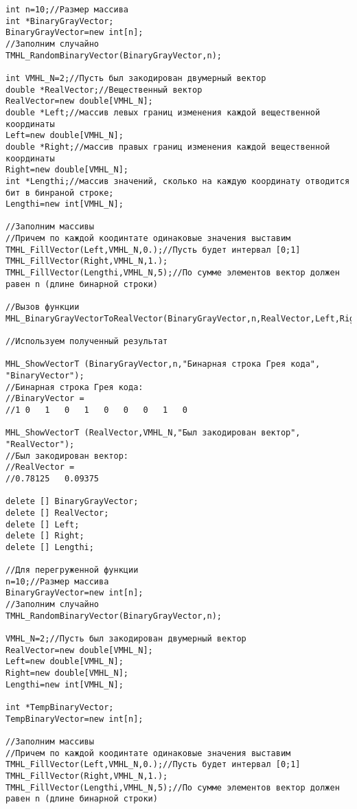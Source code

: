 \documentclass[a4paper,12pt]{article}
\begin{document}
\begin{lstlisting}[label=code_use_MHL_BinaryGrayVectorToRealVector,caption=Пример использования]
int n=10;//Размер массива
int *BinaryGrayVector;
BinaryGrayVector=new int[n];
//Заполним случайно
TMHL_RandomBinaryVector(BinaryGrayVector,n);

int VMHL_N=2;//Пусть был закодирован двумерный вектор
double *RealVector;//Вещественный вектор
RealVector=new double[VMHL_N];
double *Left;//массив левых границ изменения каждой вещественной координаты
Left=new double[VMHL_N];
double *Right;//массив правых границ изменения каждой вещественной координаты
Right=new double[VMHL_N];
int *Lengthi;//массив значений, сколько на каждую координату отводится бит в бинраной строке;
Lengthi=new int[VMHL_N];

//Заполним массивы
//Причем по каждой коодинтате одинаковые значения выставим
TMHL_FillVector(Left,VMHL_N,0.);//Пусть будет интервал [0;1]
TMHL_FillVector(Right,VMHL_N,1.);
TMHL_FillVector(Lengthi,VMHL_N,5);//По сумме элементов вектор должен равен n (длине бинарной строки)

//Вызов функции
MHL_BinaryGrayVectorToRealVector(BinaryGrayVector,n,RealVector,Left,Right,Lengthi,VMHL_N);

//Используем полученный результат

MHL_ShowVectorT (BinaryGrayVector,n,"Бинарная строка Грея кода", "BinaryVector");
//Бинарная строка Грея кода:
//BinaryVector =
//1	0	1	0	1	0	0	0	1	0

MHL_ShowVectorT (RealVector,VMHL_N,"Был закодирован вектор", "RealVector");
//Был закодирован вектор:
//RealVector =
//0.78125	0.09375

delete [] BinaryGrayVector;
delete [] RealVector;
delete [] Left;
delete [] Right;
delete [] Lengthi;

//Для перегруженной функции
n=10;//Размер массива
BinaryGrayVector=new int[n];
//Заполним случайно
TMHL_RandomBinaryVector(BinaryGrayVector,n);

VMHL_N=2;//Пусть был закодирован двумерный вектор
RealVector=new double[VMHL_N];
Left=new double[VMHL_N];
Right=new double[VMHL_N];
Lengthi=new int[VMHL_N];

int *TempBinaryVector;
TempBinaryVector=new int[n];

//Заполним массивы
//Причем по каждой коодинтате одинаковые значения выставим
TMHL_FillVector(Left,VMHL_N,0.);//Пусть будет интервал [0;1]
TMHL_FillVector(Right,VMHL_N,1.);
TMHL_FillVector(Lengthi,VMHL_N,5);//По сумме элементов вектор должен равен n (длине бинарной строки)


\end{lstlisting}
\end{document}
